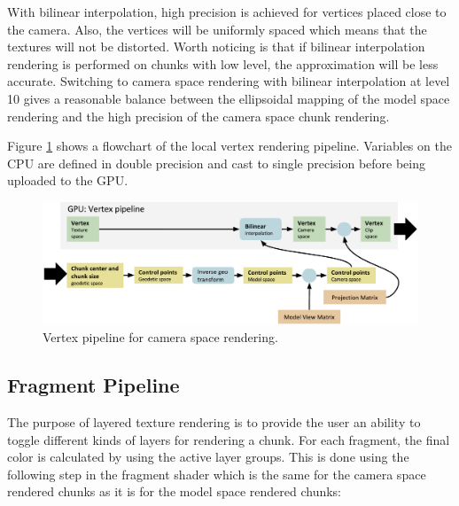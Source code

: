 With bilinear interpolation, high precision is achieved for vertices placed close to the camera. Also, the vertices will be uniformly spaced which means that the textures will not be distorted. Worth noticing is that if bilinear interpolation rendering is performed on chunks with low level, the approximation will be less accurate. Switching to camera space rendering with bilinear interpolation at level 10 gives a reasonable balance between the ellipsoidal mapping of the model space rendering and the high precision of the camera space chunk rendering.


Figure \ref{fig:pipelinelocal} shows a flowchart of the local vertex rendering pipeline. Variables on the CPU are defined in double precision and cast to single precision before being uploaded to the GPU.

\begin{figure}[htbp]
    \centering
    \includegraphics[width=\textwidth]{figures/implementation/rendering/pipeline_local.pdf}
    \caption{Vertex pipeline for camera space rendering.}
    \label{fig:pipelinelocal}
\end{figure}

\subsection{Fragment Pipeline}

The purpose of layered texture rendering is to provide the user an ability to toggle different kinds of layers for rendering a chunk. For each fragment, the final color is calculated by using the active layer groups. This is done using the following step in the fragment shader which is the same for the camera space rendered chunks as it is for the model space rendered chunks:


